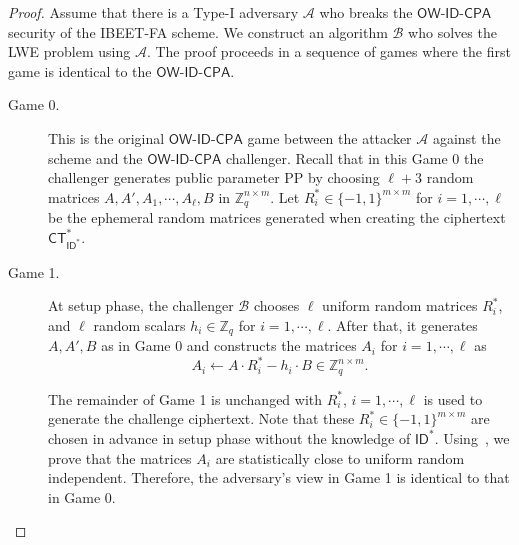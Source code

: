 \documentclass[runningheads,10pt]{llncs}
\def\ZZ{\mathbb{Z}}
\def\cal{\mathcal}
\def\CT{\mathsf{CT}}
\def\OW{\textsf{OW-ID-CPA}}
\def\ID{\mathsf{ID}}
\begin{document}
\begin{proof}
	Assume that there is a Type-I adversary $\cal{A}$ who breaks the $\OW$ security of the IBEET-FA scheme. We construct an algorithm $\cal{B}$ who solves the LWE problem using $\cal{A}$. The proof proceeds in a sequence of games where the first game is identical to the $\OW$.
	
	\begin{description}
		\item[Game 0.] This is the original $\OW$ game between the attacker $\cal{A}$ against the scheme and the $\OW$ challenger. Recall that in this Game 0 the challenger generates public parameter PP by choosing $\ell + 3$ random matrices $A, A', A_1, \cdots, A_\ell, B$ in $\ZZ_q^{n \times m}$. Let $R^*_i\in\{-1,1\}^{m\times m}$ for $i=1,\cdots,\ell$ be the ephemeral random matrices generated when creating the ciphertext $\CT_{\ID^*}^*$.\\
		
		\item[Game 1.] At setup phase, the challenger $\cal{B}$ chooses $\ell$ uniform random matrices $R_i^*$, and $\ell$ random scalars $h_i\in\ZZ_q$ for $i=1,\cdots,\ell$. After that, it generates $A, A', B$ as in Game 0 and constructs the matrices $A_i$ for $i=1,\cdots,\ell$ as
		$$A_i\gets A\cdot R^*_i-h_i\cdot B\in\ZZ_q^{n\times m}.$$
		
		The remainder of Game 1 is unchanged with $R_i^*$, $i=1,\cdots, \ell$ is used to generate the challenge ciphertext. Note that these $R^*_i\in\{-1,1\}^{m\times m}$ are chosen in advance in setup phase without the knowledge of $\ID^*$. Using~{\cite[Lemma 13]{ABB10-EuroCrypt}}, we prove that the matrices $A_i$ are statistically close to uniform random independent. Therefore, the adversary's view in Game 1 is identical to that in Game 0.\\
		

\end{description}
\end{proof}
\end{document}
